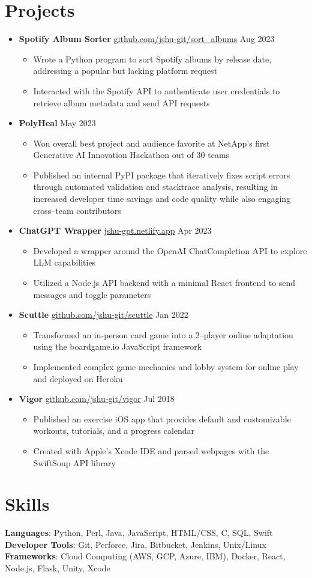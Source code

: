 \documentclass[letterpaper,11pt]{article}
\newcommand{\sectionStart}{\begin{itemize}[leftmargin=0in, label={}]}
\newcommand{\sectionEnd}{\end{itemize}\vspace{-8pt}}
\newcommand{\singleHeading}[2]{
  \item
    #1 \hspace*{\fill} #2 \\
    \vspace{-6pt}
}
\newcommand{\itemListStart}{\begin{itemize}}
\newcommand{\itemListEnd}{\end{itemize}\vspace{-12pt}}
\newcommand{\resumeItem}[1]{
  \item
    \small #1
    \vspace{-3pt} %
}
\begin{document}
  \section{Projects}
    \sectionStart
      \singleHeading{\textbf{Spotify Album Sorter} \href{https://github.com/jshu-git/sort_albums}{github.com/jshu-git/sort\_albums}}{Aug 2023}
        \itemListStart
          \resumeItem{Wrote a Python program to sort Spotify albums by release date, addressing a popular but lacking platform request}
          \resumeItem{Interacted with the Spotify API to authenticate user credentials to retrieve album metadata and send API requests}
        \itemListEnd
      \singleHeading{\textbf{PolyHeal}}{May 2023}
        \itemListStart
          \resumeItem{Won overall best project and audience favorite at NetApp's first Generative AI Innovation Hackathon out of 30 teams}
          \resumeItem{Published an internal PyPI package that iteratively fixes script errors through automated validation and stacktrace analysis, resulting in increased developer time savings and code quality while also engaging cross--team contributors}
        \itemListEnd
      \singleHeading{\textbf{ChatGPT Wrapper} \href{https://jshu-gpt.netlify.app}{jshu-gpt.netlify.app}}{Apr 2023}
        \itemListStart
          \resumeItem{Developed a wrapper around the OpenAI ChatCompletion API to explore LLM capabilities}
          \resumeItem{Utilized a Node.js API backend with a minimal React frontend to send messages and toggle parameters}
        \itemListEnd
      \singleHeading{\textbf{Scuttle} \href{https://github.com/jshu-git/scuttle}{github.com/jshu-git/scuttle}}{Jan 2022}
        \itemListStart
          \resumeItem{Transformed an in-person card game into a 2--player online adaptation using the boardgame.io JavaScript framework}
          \resumeItem{Implemented complex game mechanics and lobby system for online play and deployed on Heroku}
        \itemListEnd
      \singleHeading{\textbf{Vigor} \href{https://github.com/jshu-git/vigor}{github.com/jshu-git/vigor}}{Jul 2018}
        \itemListStart
          \resumeItem{Published an exercise iOS app that provides default and customizable workouts, tutorials, and a progress calendar}
          \resumeItem{Created with Apple’s Xcode IDE and parsed webpages with the SwiftSoup API library}
        \itemListEnd
    \sectionEnd

  \section{Skills}
    \sectionStart
      \small{
        \item{
          \textbf{Languages}{: Python, Perl, Java, JavaScript, HTML/CSS, C, SQL, Swift} \\
          \textbf{Developer Tools}{: Git, Perforce, Jira, Bitbucket, Jenkins, Unix/Linux} \\
          \textbf{Frameworks}{: Cloud Computing (AWS, GCP, Azure, IBM), Docker, React, Node.js, Flask, Unity, Xcode} \\
        }
      }
    \sectionEnd
    \vspace{-6pt} %
\end{document}
